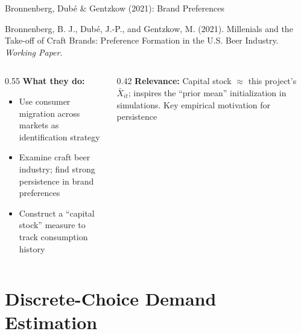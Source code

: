 \documentclass[aspectratio=169,professionalfonts]{beamer}
\newcommand{\hl}[1]{\textbf{\textcolor{UGARed}{#1}}}
\begin{document}
\begin{frame}{Bronnenberg, Dub\'e \& Gentzkow (2021): Brand Preferences}
  \begin{tcolorbox}[colback=red!5!white, colframe=UGARed, title=\textbf{Citation}]
    Bronnenberg, B. J., Dub\'e, J.-P., and Gentzkow, M. (2021). Millenials and the Take-off of Craft Brands: Preference Formation in the U.S. Beer Industry. \\
    \textit{Working Paper}.
  \end{tcolorbox}
  \vspace{6pt}
  \begin{columns}[T]
    \begin{column}{0.55\textwidth}
      \hl{What they do:}
      \begin{itemize}
        \item Use consumer migration across markets as identification strategy
        \item Examine craft beer industry; find strong persistence in brand preferences
        \item Construct a ``capital stock'' measure to track consumption history
      \end{itemize}
    \end{column}
    \begin{column}{0.42\textwidth}
      \hl{Relevance:} Capital stock $\approx$ this project's $\bar{X}_{it}$; inspires
      the ``prior mean'' initialization in simulations. Key empirical motivation for persistence
    \end{column}
  \end{columns}
\end{frame}

\section{Discrete-Choice Demand Estimation}
\end{document}
